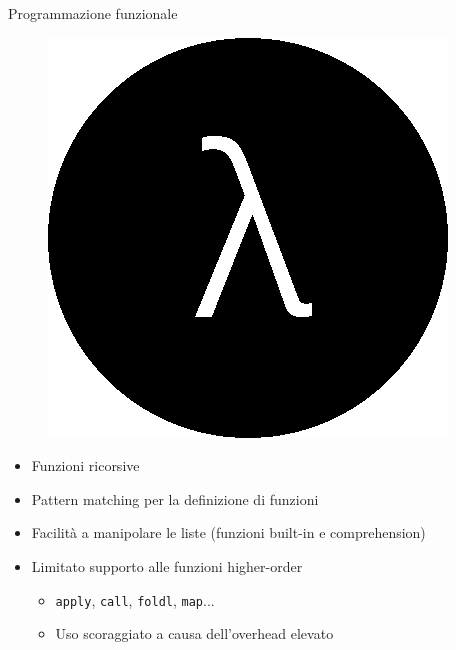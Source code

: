 \begin{frame}{Programmazione funzionale}

	\begin{figure}
		\hfill
		\includegraphics[scale=0.1]{res/lambda}
	\end{figure}

	\begin{itemize}
		\item Funzioni ricorsive
		\item Pattern matching per la definizione di funzioni
		\item Facilità a manipolare le liste (funzioni built-in e comprehension)
		\item Limitato supporto alle funzioni higher-order
			\begin{itemize}
				\item \texttt{apply}, \texttt{call}, \texttt{foldl}, \texttt{map}...
				\item Uso scoraggiato a causa dell'overhead elevato
			\end{itemize}
	\end{itemize}


\end{frame}
